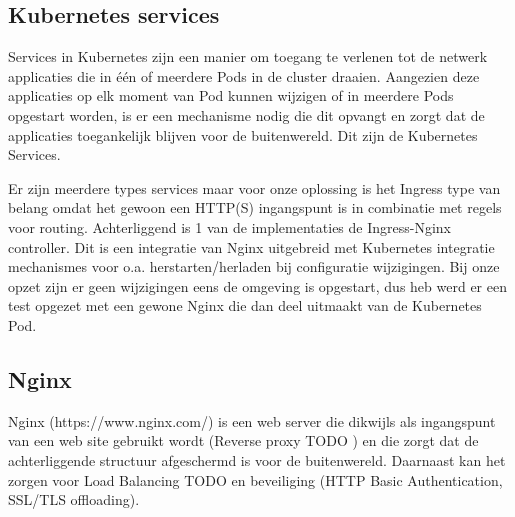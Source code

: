 \subsection{Kubernetes services}
Services in Kubernetes zijn een manier om toegang te verlenen tot de netwerk applicaties die in één of meerdere Pods in de cluster draaien. Aangezien deze applicaties op elk moment van Pod kunnen wijzigen of in meerdere Pods opgestart worden, is er een mechanisme nodig die dit opvangt en zorgt dat de applicaties toegankelijk blijven voor de buitenwereld. Dit zijn de Kubernetes Services.
\autocite{Kubernetes2023b}

Er zijn meerdere types services maar voor onze oplossing is het Ingress type van belang omdat het gewoon een HTTP(S) ingangspunt is in combinatie met regels voor routing. Achterliggend is 1 van de implementaties de Ingress-Nginx controller. Dit is een integratie van Nginx uitgebreid met Kubernetes integratie mechanismes voor o.a. herstarten/herladen bij configuratie wijzigingen. Bij onze opzet zijn er geen wijzigingen eens de omgeving is opgestart, dus heb werd er een test opgezet met een gewone Nginx die dan deel uitmaakt van de Kubernetes Pod.
\autocite{Kubernetes2023d}


\subsection{Nginx}
Nginx (https://www.nginx.com/) is een web server die dikwijls als ingangspunt van een web site gebruikt wordt (Reverse proxy TODO \autocite{Wikipedia2023d}) en die zorgt dat de achterliggende structuur afgeschermd is voor de buitenwereld. Daarnaast kan het zorgen voor Load Balancing TODO \autocite{Wikipedia2023c} en beveiliging (HTTP Basic Authentication, SSL/TLS offloading).
\newline
\newline


